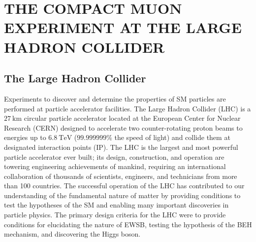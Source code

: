 
\chapter{THE COMPACT MUON EXPERIMENT AT THE LARGE HADRON COLLIDER}
\label{The_CMS_Experiment_at_the_LHC}

\section{The Large Hadron Collider}
Experiments to discover and determine the properties of SM particles are performed at particle accelerator facilities.
The Large Hadron Collider (LHC) is a $\SI{27}{\km}$ circular particle accelerator located at the European Center for Nuclear Research (CERN) designed to accelerate two counter-rotating proton beams to energies up to $\SI{6.8}{\TeV}$ ($99.999999\%$ the speed of light) and collide them at designated interaction points (IP).
The LHC is the largest and most powerful particle accelerator ever built; its design, construction, and operation are towering engineering achievements of mankind, requiring an international collaboration of thousands of scientists, engineers, and technicians from more than 100 countries.
The successful operation of the LHC has contributed to our understanding of the fundamental nature of matter by providing conditions to test the hypotheses of the SM and enabling many important discoveries in particle physics.
The primary design criteria for the LHC were to provide conditions for elucidating the nature of EWSB, testing the hypothesis of the BEH mechanism, and discovering the Higgs boson.

